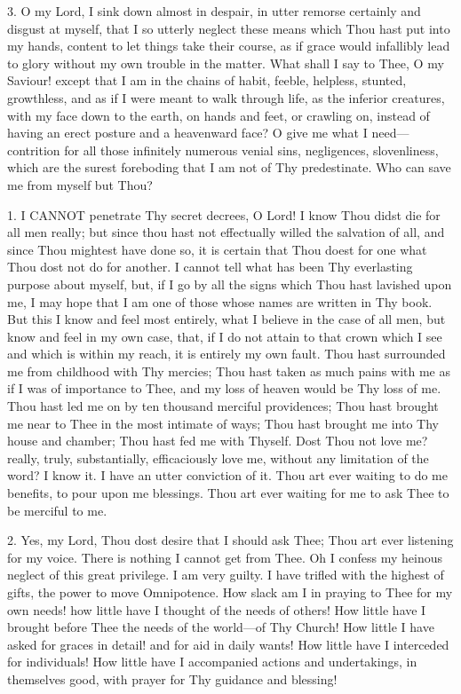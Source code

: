 3. O my Lord, I sink down almost
in despair, in utter remorse certainly and disgust at myself, that I so
utterly neglect these means which Thou hast put into my hands, content
to let things take their course, as if grace would infallibly lead to
glory without my own trouble in the matter. What shall I say to Thee, O
my Saviour! except that I am in the chains of habit, feeble, helpless,
stunted, growthless, and as if I were meant to walk through life, as the
inferior creatures, with my face down to the earth, on hands and feet,
or crawling on, instead of having an erect posture and a heavenward
face? O give me what I need—contrition for all those infinitely
numerous venial sins, negligences, slovenliness, which are the surest
foreboding that I am not of Thy predestinate. Who can save me from
myself but Thou?


1. I CANNOT
penetrate Thy secret decrees, O Lord! I know Thou didst die for all men
really; but since thou hast not effectually willed the salvation of all,
and since Thou mightest have done so, it is certain that Thou doest for
one what Thou dost not do for another. I cannot tell what has been Thy
everlasting purpose about myself, but, if I go by all the signs which
Thou hast lavished upon me, I may hope that I am one of those whose
names are written in Thy book. But this I know and feel most entirely,
what I believe in the case of all men, but know and feel in my own
case, that, if I do not attain to that crown which I see and which is
within my reach, it is entirely my own fault. Thou hast surrounded me
from childhood with Thy mercies; Thou hast taken as much pains with me
as if I was of importance to Thee, and my loss of heaven would be Thy
loss of me. Thou hast led me on by ten thousand merciful providences;
Thou hast brought me near to Thee in the most intimate of ways; Thou
hast brought me into Thy house and chamber; Thou hast fed me with
Thyself. Dost Thou not love me? really, truly, substantially,
efficaciously love me, without any limitation of the word? I know it. I
have an utter conviction of it. Thou art ever waiting to do me benefits,
to pour upon me blessings. Thou art ever waiting for me to ask Thee to
be merciful to me.

2. Yes, my Lord, Thou dost
desire that I should ask Thee; Thou art ever listening for my voice.
There is nothing I cannot get from Thee. Oh I confess my heinous neglect
of this great privilege. I am very guilty. I have trifled with the
highest of gifts, the power to move Omnipotence. How slack am I in
praying to Thee for my own needs! how little have I thought of the needs
of others! How little have I brought before Thee the needs of the
world—of Thy Church! How little I have asked for graces in detail! and
for aid in daily wants! How little have I interceded for individuals!
How little have I accompanied actions and undertakings, in themselves
good, with prayer for Thy guidance and blessing!

